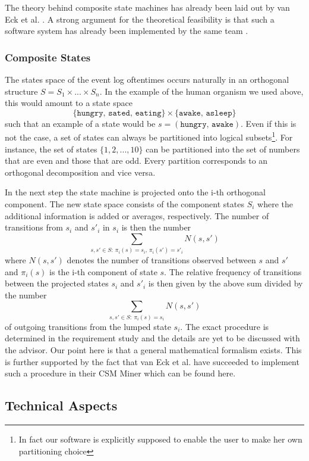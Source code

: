 \documentclass[12pt]{extarticle}
\begin{document}
The theory behind composite state machines has already been laid out by van Eck et al. \cite{csm-intro}. A strong argument for the theoretical feasibility is that such a software system has already been implemented by the same team \cite{prom}.

\subsubsection{Composite States}

The states space of the event log oftentimes occurs naturally in an orthogonal structure $S = S_1 \times ... \times S_n$. In the example of the human organism we used above, this would amount to a state space
\[ \{ \texttt{hungry, sated, eating} \} \times \{ \texttt{awake, asleep} \} \]
such that an example of a state would be $s = (\texttt{hungry, awake})$. Even if this is not the case, a set of states can always be partitioned into logical subsets\footnote{In fact our software is explicitly supposed to enable the user to make her own partitioning choice}. For instance, the set of states $\{1, 2, ..., 10\}$ can be partitioned into the set of numbers that are even and those that are odd. Every partition corresponds to an orthogonal decomposition and vice versa.

In the next step the state machine is projected onto the i-th orthogonal component. The new state space consists of the component states $S_i$ where the additional information is added or averages, respectively. The number of transitions from $s_i$ and $s'_i$ in $s_i$ is then the number
\[ \sum_{s,s' \in S:\ \pi_i(s) = s_i,\, \pi_i(s') = s'_i} N(s,s') \]
where $N(s,s')$ denotes the number of transitions observed between $s$ and $s'$ and $\pi_i(s)$ is the i-th component of state $s$. The relative frequency of transitions between the projected states $s_i$ and $s'_i$ is then given by the above sum divided by the number
\[
    \sum_{s,s' \in S:\ \pi_i(s) = s_i} N(s,s')
\]
of outgoing transitions from the lumped state $s_i$. The exact procedure is determined in the requirement study and the details are yet to be discussed with the advisor. Our point here is that a general mathematical formalism exists. This is further supported by the fact that van Eck et al. have succeeded to implement such a procedure in their CSM Miner which can be found here\cite{prom}.


\subsection{Technical Aspects}
\end{document}
